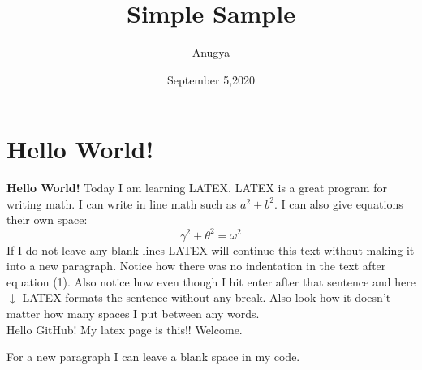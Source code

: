 \documentclass[10 pt]{article}
\begin{document}
\title{Simple Sample}
\author{Anugya}
\date{September 5,2020}
\maketitle
\section{Hello World!}
\textbf{Hello World!}
Today I am learning {\Large L}A{\Large T}E{\Large X}. LATEX is a great program for writing math. I can write in line math such as $a^2+b^2$. I can also give equations their own space:
\begin{equation}
\gamma^2+\theta^2=\omega^2
\end{equation}
If I do not leave any blank lines LATEX will continue this text without making it into a new paragraph. Notice how there was no indentation in the text after equation (1). Also notice how even though I hit enter after that sentence and here $\downarrow$ LATEX formats the sentence without any break. Also look how it doesn't
matter how many spaces I put between any words. \\ 
Hello GitHub! My latex page is this!! Welcome.

For a new paragraph I can leave a blank space in my code.
\end{document}
